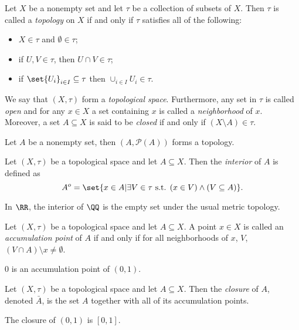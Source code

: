 \begin{definition*}
	Let $X$ be a nonempty set and let $\tau$ be a collection of subsets of $X$.
	Then $\tau$ is called a \textit{topology} on $X$ if and only if $\tau$ satisfies all of the following:
	\begin{itemize}
		\item $X\in\tau$ and $\emptyset\in\tau$;
		\item if $U,V\in\tau$, then $U\cap V\in\tau$;
		\item if $\set{U_i}_{i\in I}\subseteq\tau$ then $\cup_{i\in I} U_i\in\tau$.
	\end{itemize}
	We say that $(X,\tau)$ form a \textit{topological space}.
	Furthermore, any set in $\tau$ is called \textit{open} and for any $x\in X$ a set containing $x$ is called a \textit{neighborhood} of $x$.
	Moreover, a set $A\subseteq X$ is said to be \textit{closed} if and only if $(X\setminus A)\in\tau$.
\end{definition*}
\begin{example*}
	Let $A$ be a nonempty set, then $(A,\mathcal{P}(A))$ forms a topology.
\end{example*}

\begin{definition*}
	Let $(X,\tau)$ be a topological space and let $A\subseteq X$.
	Then the \textit{interior} of $A$ is defined as
	\[
	A^o=\set{x\in A|\exists V\in\tau \text{ s.t. }(x\in V)\wedge (V\subseteq A)}.
	\]
\end{definition*}
\begin{example*}
	In $\RR$, the interior of $\QQ$ is the empty set under the usual metric topology.
\end{example*}

\begin{definition*}
	Let $(X,\tau)$ be a topological space and let $A\subseteq X$.
	A point $x\in X$ is called an \textit{accumulation point} of $A$ if and only if for all neighborhoods of $x$, $V$, $(V\cap A)\setminus{x}\neq\emptyset$.
\end{definition*}
\begin{example*}
	$0$ is an accumulation point of $(0,1)$.
\end{example*}

\begin{definition*}
	Let $(X,\tau)$ be a topological space and let $A\subseteq X$.
	Then the \textit{closure} of $A$, denoted $\bar{A}$, is the set $A$ together with all of its accumulation points.
\end{definition*}
\begin{example*}
	The closure of $(0,1)$ is $[0,1]$.
\end{example*}

